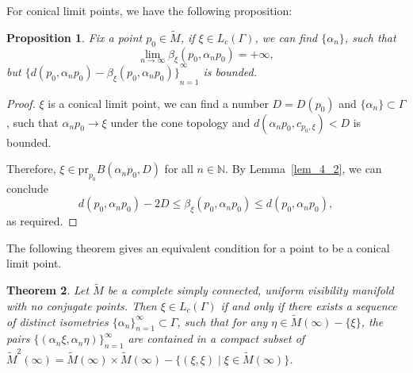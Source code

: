 \documentclass[reqno,11pt]{article}
\newtheorem{theorem}{Theorem}[section]
\newtheorem{proposition}[theorem]{Proposition}
\theoremstyle{definition}
\theoremstyle{remark}
\numberwithin{equation}{section}
\begin{document}
For conical limit points, we have the following proposition:

\begin{proposition}\label{prop_5_2}
	Fix a point $p_0\in\widetilde{M}$, if $\xi\in L_c(\Gamma)$, we can find $\{\alpha_n\}$, such that
	\begin{displaymath}
		\lim_{n\to\infty}\beta_{\xi}(p_0,\alpha_n p_0)=+\infty,
	\end{displaymath}
	but ${\{d(p_0,\alpha_n p_0)-\beta_{\xi}(p_0,\alpha_n p_0)\}}_{n=1}^\infty$ is bounded.
\end{proposition}

\begin{proof}
	$\xi$ is a conical limit point, we can find a number $D=D(p_0)$ and $\{\alpha_n\}\subset\Gamma$, such that $\alpha_n p_0\to\xi$ under the cone topology and $d(\alpha_n p_0, c_{p_0,\xi})<D$ is bounded.

	Therefore, $\xi\in\text{pr}_{p_0}B(\alpha_n p_0, D)$ for all $n\in\mathbb{N}$. By Lemma~\ref{lem_4_2}, we can conclude
	\begin{displaymath}
		d(p_0,\alpha_n p_0)-2D\leq \beta_\xi(p_0,\alpha_n p_0)\leq d(p_0,\alpha_n p_0),
	\end{displaymath}
    as required.
\end{proof}

The following theorem gives an equivalent condition for a point to be a conical limit point.
\begin{theorem}\label{thm_5_3}
	Let $\widetilde{M}$ be a complete simply connected, uniform visibility manifold with no conjugate points. Then $\xi\in L_c(\Gamma)$ if and only if there exists a sequence of distinct isometries ${\{\alpha_n\}}_{n=1}^\infty\subset\Gamma$, such that for any $\eta\in\widetilde{M}(\infty)-\{\xi\}$, the pairs ${\{(\alpha_n\xi, \alpha_n\eta)\}}_{n=1}^\infty$ are contained in a compact subset of $\widetilde{M}^2(\infty)=\widetilde{M}(\infty)\times\widetilde{M}(\infty)-\{(\xi,\xi)\mid\xi\in\widetilde{M}(\infty)\}$.
\end{theorem}
\end{document}
